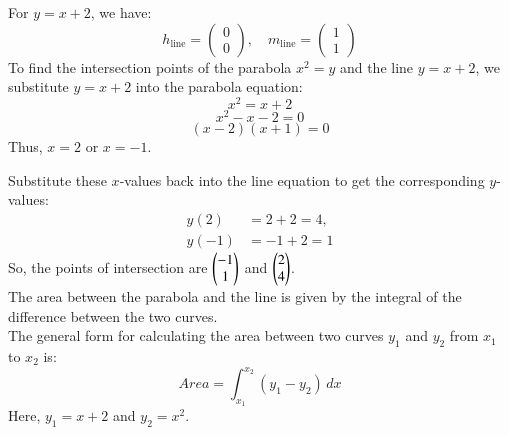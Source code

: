 \documentclass[journal]{IEEEtran}
\begin{document}
For $y = x + 2$, we have:
\begin{equation}
h_{\text{line}} = \begin{pmatrix} 0 \\ 0 \end{pmatrix}, \quad m_{\text{line}} = \begin{pmatrix} 1 \\ 1 \end{pmatrix}
\end{equation}
To find the intersection points of the parabola $x^2 = y$ and the line $y = x + 2$, we substitute $y = x + 2$ into the parabola equation:
\begin{equation}
x^2 = x + 2
\end{equation}
\begin{equation}
x^2 - x - 2 = 0
\end{equation}
\begin{equation}
(x - 2)(x + 1) = 0
\end{equation}
Thus, $x = 2$ or $x = -1$.

Substitute these $x$-values back into the line equation to get the corresponding $y$-values:
\begin{align}
y(2) &= 2 + 2 = 4, \\
y(-1) &= -1 + 2 = 1
\end{align}
So, the points of intersection are $\begin{pmatrix}-1\\1\end{pmatrix}$ and $\begin{pmatrix}2\\4\end{pmatrix}$.\\
The area between the parabola and the line is given by the integral of the difference between the two curves.\\ The general form for calculating the area between two curves $y_1$ and $y_2$ from $x_1$ to $x_2$ is:
\begin{equation}
Area = \int_{x_1}^{x_2} (y_1 - y_2) \, dx
\end{equation}
Here, $y_1 = x + 2$ and $y_2 = x^2$.
\end{document}
